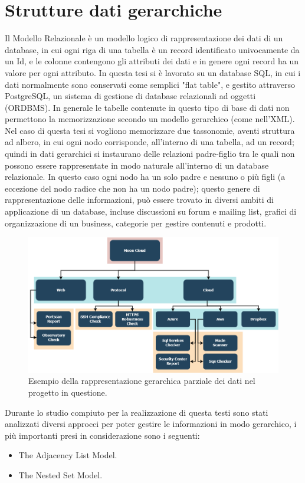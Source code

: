 \section{Strutture dati gerarchiche}
Il Modello Relazionale è un modello logico di rappresentazione dei dati di un database, in cui ogni riga di una tabella è un record identificato univocamente
da un Id, e le colonne contengono gli attributi dei dati e in genere ogni record ha un valore per ogni attributo.\hfill\break
In questa tesi si è lavorato su un database SQL, in cui i dati normalmente sono conservati come semplici "flat table", e gestito attraverso PostgreSQL, 
un sistema di gestione di database relazionali ad oggetti (ORDBMS). In generale le tabelle contenute in questo tipo di base di dati non permettono la 
memorizzazione secondo un modello gerarchico (come nell'XML).\hfill\break
Nel caso di questa tesi si vogliono memorizzare due tassonomie, aventi struttura ad albero, in cui ogni nodo corrisponde, all'interno di una tabella, ad un 
record; quindi in dati gerarchici si instaurano delle relazioni padre-figlio tra le quali non possono essere rappresentate in modo naturale 
all'interno di un database relazionale.\hfill\break
In questo caso ogni nodo ha un solo padre e nessuno o più figli (a eccezione del nodo radice che non ha un nodo padre); questo genere di rappresentazione 
delle informazioni, può essere trovato in diversi ambiti di applicazione di un database, incluse discussioni su forum e mailing list, 
grafici di organizzazione di un business, categorie per gestire contenuti e prodotti.
%
\begin{figure}[ht!]
    \centering
    \includegraphics[scale=0.46]{images/MC_Rec_Tree.png}
    \caption{Esempio della rappresentazione gerarchica parziale dei dati nel progetto in questione.}
    \label{fig:MC_Rec_Tree}
\end{figure}
\hfill\break
Durante lo studio compiuto per la realizzazione di questa testi sono stati analizzati diversi approcci per poter gestire le informazioni in modo gerarchico, 
i più importanti presi in considerazione sono i seguenti: 
\begin{itemize}
    \item The Adjacency List Model.
    \item The Nested Set Model.
\end{itemize}
%
